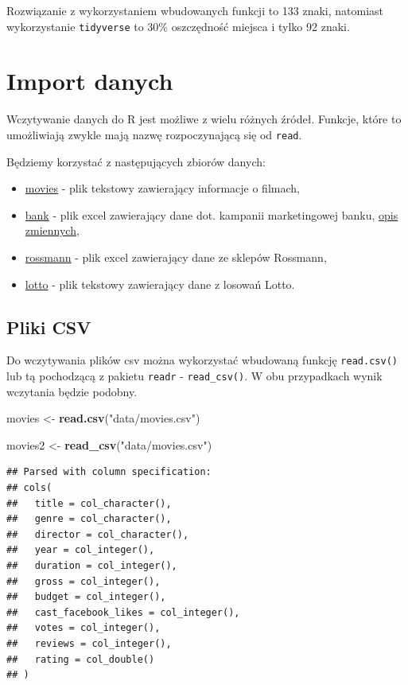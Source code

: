 \documentclass[]{book}
\newenvironment{Shaded}{\begin{snugshade}}{\end{snugshade}}
\newcommand{\KeywordTok}[1]{\textcolor[rgb]{0.13,0.29,0.53}{\textbf{#1}}}
\newcommand{\StringTok}[1]{\textcolor[rgb]{0.31,0.60,0.02}{#1}}
\newcommand{\NormalTok}[1]{#1}
\providecommand{\tightlist}{%
  \setlength{\itemsep}{0pt}\setlength{\parskip}{0pt}}
\begin{document}
Rozwiązanie z wykorzystaniem wbudowanych funkcji to 133 znaki, natomiast
wykorzystanie \texttt{tidyverse} to 30\% oszczędność miejsca i tylko 92
znaki.

\section{Import danych}\label{import-danych}

Wczytywanie danych do R jest możliwe z wielu różnych źródeł. Funkcje,
które to umożliwiają zwykle mają nazwę rozpoczynającą się od
\texttt{read}.

Będziemy korzystać z następujących zbiorów danych:

\begin{itemize}
\tightlist
\item
  \href{data/movies.csv}{movies} - plik tekstowy zawierający informacje
  o filmach,
\item
  \href{data/bank.xlsx}{bank} - plik excel zawierający dane dot.
  kampanii marketingowej banku, \href{data/bank_opis.pdf}{opis
  zmiennych},
\item
  \href{data/rossmann.xlsx}{rossmann} - plik excel zawierający dane ze
  sklepów Rossmann,
\item
  \href{http://www.mbnet.com.pl/dl.txt}{lotto} - plik tekstowy
  zawierający dane z losowań Lotto.
\end{itemize}

\subsection{Pliki CSV}\label{pliki-csv}

Do wczytywania plików csv można wykorzystać wbudowaną funkcję
\texttt{read.csv()} lub tą pochodzącą z pakietu \texttt{readr} -
\texttt{read\_csv()}. W obu przypadkach wynik wczytania będzie podobny.

\begin{Shaded}
\begin{Highlighting}[]
\NormalTok{movies <-}\StringTok{ }\KeywordTok{read.csv}\NormalTok{(}\StringTok{"data/movies.csv"}\NormalTok{)}

\NormalTok{movies2 <-}\StringTok{ }\KeywordTok{read_csv}\NormalTok{(}\StringTok{"data/movies.csv"}\NormalTok{)}
\end{Highlighting}
\end{Shaded}

\begin{verbatim}
## Parsed with column specification:
## cols(
##   title = col_character(),
##   genre = col_character(),
##   director = col_character(),
##   year = col_integer(),
##   duration = col_integer(),
##   gross = col_integer(),
##   budget = col_integer(),
##   cast_facebook_likes = col_integer(),
##   votes = col_integer(),
##   reviews = col_integer(),
##   rating = col_double()
## )
\end{verbatim}
\end{document}
